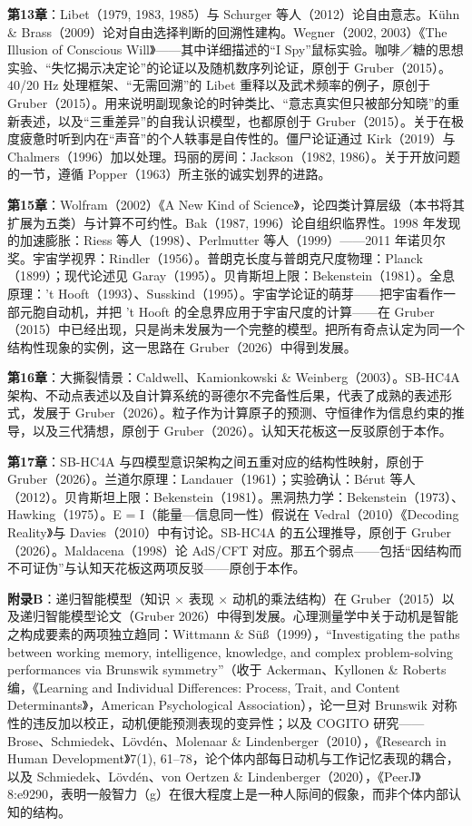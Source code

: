 \documentclass[11pt, twoside, openright]{book}
\begin{document}
\textbf{第13章}：Libet（1979, 1983, 1985）与 Schurger 等人（2012）论自由意志。Kühn \& Brass（2009）论对自由选择判断的回溯性建构。Wegner（2002, 2003）《The Illusion of Conscious Will》------其中详细描述的“I Spy”鼠标实验。咖啡／糖的思想实验、“失忆揭示决定论”的论证以及随机数序列论证，原创于 Gruber（2015）。40/20 Hz 处理框架、“无需回溯”的 Libet 重释以及武术频率的例子，原创于 Gruber（2015）。用来说明副现象论的时钟类比、“意志真实但只被部分知晓”的重新表述，以及“三重差异”的自我认识模型，也都原创于 Gruber（2015）。关于在极度疲惫时听到内在“声音”的个人轶事是自传性的。僵尸论证通过 Kirk（2019）与 Chalmers（1996）加以处理。玛丽的房间：Jackson（1982, 1986）。关于开放问题的一节，遵循 Popper（1963）所主张的诚实划界的进路。

\textbf{第15章}：Wolfram（2002）《A New Kind of Science》，论四类计算层级（本书将其扩展为五类）与计算不可约性。Bak（1987, 1996）论自组织临界性。1998 年发现的加速膨胀：Riess 等人（1998）、Perlmutter 等人（1999）------2011 年诺贝尔奖。宇宙学视界：Rindler（1956）。普朗克长度与普朗克尺度物理：Planck（1899）；现代论述见 Garay（1995）。贝肯斯坦上限：Bekenstein（1981）。全息原理：'t Hooft（1993）、Susskind（1995）。宇宙学论证的萌芽------把宇宙看作一部元胞自动机，并把 't Hooft 的全息界应用于宇宙尺度的计算------在 Gruber（2015）中已经出现，只是尚未发展为一个完整的模型。把所有奇点认定为同一个结构性现象的实例，这一思路在 Gruber（2026）中得到发展。

\textbf{第16章}：大撕裂情景：Caldwell、Kamionkowski \& Weinberg（2003）。SB-HC4A 架构、不动点表述以及自计算系统的哥德尔不完备性后果，代表了成熟的表述形式，发展于 Gruber（2026）。粒子作为计算原子的预测、守恒律作为信息约束的推导，以及三代猜想，原创于 Gruber（2026）。认知天花板这一反驳原创于本作。

\textbf{第17章}：SB-HC4A 与四模型意识架构之间五重对应的结构性映射，原创于 Gruber（2026）。兰道尔原理：Landauer（1961）；实验确认：Bérut 等人（2012）。贝肯斯坦上限：Bekenstein（1981）。黑洞热力学：Bekenstein（1973）、Hawking（1975）。E = I（能量---信息同一性）假说在 Vedral（2010）《Decoding Reality》与 Davies（2010）中有讨论。SB-HC4A 的五公理推导，原创于 Gruber（2026）。Maldacena（1998）论 AdS/CFT 对应。那五个弱点------包括“因结构而不可证伪”与认知天花板这两项反驳------原创于本作。

\textbf{附录B}：递归智能模型（知识 × 表现 × 动机的乘法结构）在 Gruber（2015）以及递归智能模型论文（Gruber 2026）中得到发展。心理测量学中关于动机是智能之构成要素的两项独立趋同：Wittmann \& Süß（1999），“Investigating the paths between working memory, intelligence, knowledge, and complex problem-solving performances via Brunswik symmetry”（收于 Ackerman、Kyllonen \& Roberts 编，《Learning and Individual Differences: Process, Trait, and Content Determinants》，American Psychological Association），论一旦对 Brunswik 对称性的违反加以校正，动机便能预测表现的变异性；以及 COGITO 研究------Brose、Schmiedek、Lövdén、Molenaar \& Lindenberger（2010），《Research in Human Development》7(1), 61--78，论个体内部每日动机与工作记忆表现的耦合，以及 Schmiedek、Lövdén、von Oertzen \& Lindenberger（2020），《PeerJ》8:e9290，表明一般智力（g）在很大程度上是一种人际间的假象，而非个体内部认知的结构。
\end{document}
